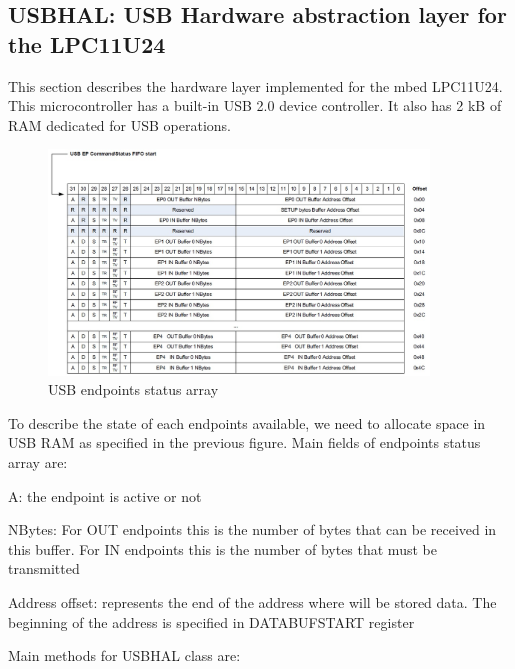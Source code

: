 \documentclass[pdftex,10pt,a4paper]{report}
\newenvironment{packed_item}{
\begin{itemize}
  \setlength{\itemsep}{1pt}
  \setlength{\parskip}{0pt}
  \setlength{\parsep}{0pt}
}{\end{itemize}}
\begin{document}
\subsection{USBHAL: USB Hardware abstraction layer for the LPC11U24}
This section describes the hardware layer implemented for the mbed LPC11U24. This microcontroller has a built-in USB 2.0 device controller. It also has 2 kB of RAM dedicated for USB operations.

\begin{figure}[h!]
		\centering
		\includegraphics[width=0.9\textwidth]{./usb_endpoints.jpg}
		\caption{USB endpoints status array}
		\label{USB endpoints status array}
\end{figure}

To describe the state of each endpoints available, we need to allocate space in USB RAM as specified in the previous figure. Main fields of endpoints status array are:
\begin{packed_item}
	\item A: the endpoint is active or not
	\item NBytes: For OUT endpoints this is the number of bytes that can be received in this buffer. For IN endpoints this is the number of bytes that must be transmitted
	\item Address offset: represents the end of the address where will be stored data. The beginning of the address is specified in DATABUFSTART register 
\end{packed_item}


Main methods for USBHAL class are:
\end{document}
